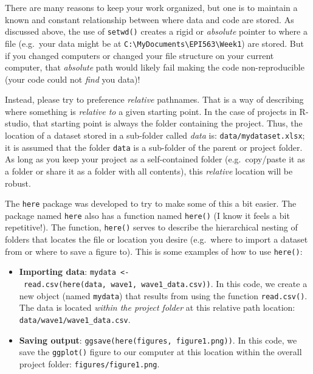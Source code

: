 \documentclass[
]{book}
\providecommand{\tightlist}{%
  \setlength{\itemsep}{0pt}\setlength{\parskip}{0pt}}
\begin{document}
There are many reasons to keep your work organized, but one is to maintain a known and constant relationship between where data and code are stored. As discussed above, the use of \texttt{setwd()} creates a rigid or \emph{absolute} pointer to where a file (e.g.~your data might be at \texttt{C:\textbackslash{}MyDocuments\textbackslash{}EPI563\textbackslash{}Week1}) are stored. But if you changed computers or changed your file structure on your current computer, that \emph{absolute} path would likely fail making the code non-reproducible (your code could not \emph{find} you data)!

Instead, please try to preference \emph{relative} pathnames. That is a way of describing where something is \emph{relative to} a given starting point. In the case of projects in R-studio, that starting point is always the folder containing the project. Thus, the location of a dataset stored in a sub-folder called \emph{data} is: \texttt{data/mydataset.xlsx}; it is assumed that the folder \texttt{data} is a sub-folder of the parent or project folder. As long as you keep your project as a self-contained folder (e.g.~copy/paste it as a folder or share it as a folder with all contents), this \emph{relative} location will be robust.

The \texttt{here} package was developed to try to make some of this a bit easier. The package named \texttt{here} also has a function named \texttt{here()} (I know it feels a bit repetitive!). The function, \texttt{here()} serves to describe the hierarchical nesting of folders that locates the file or location you desire (e.g.~where to import a dataset from or where to save a figure to). This is some examples of how to use \texttt{here()}:

\begin{itemize}
\tightlist
\item
  \textbf{Importing data}: \texttt{mydata\ \textless{}-\ read.csv(here(\textquotesingle{}data\textquotesingle{},\ \textquotesingle{}wave1\textquotesingle{},\ \textquotesingle{}wave1\_data.csv))}. In this code, we create a new object (named \texttt{mydata}) that results from using the function \texttt{read.csv()}. The data is located \emph{within the project folder} at this relative path location: \texttt{data/wave1/wave1\_data.csv}.
\item
  \textbf{Saving output}: \texttt{ggsave(here(\textquotesingle{}figures\textquotesingle{},\ \textquotesingle{}figure1.png\textquotesingle{}))}. In this code, we save the \texttt{ggplot()} figure to our computer at this location within the overall project folder: \texttt{figures/figure1.png}.
\end{itemize}
\end{document}
